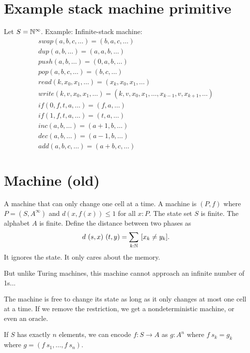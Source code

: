\section{Example stack machine primitive}

Let \(S = \mathbb{N}^\infty\).
Example:
Infinite-stack machine:
\begin{align*}
    swap(a,b,c,\ldots) = (b,a,c,\ldots)
    \\
    dup(a,b,\ldots) = (a,a,b,\ldots)
    \\
    push(a,b,\ldots) = (0,a,b,\ldots)
    \\
    pop(a,b,c,\ldots) = (b,c,\ldots)
    \\
    read(k,x_0,x_1,\ldots) = (x_k,x_0,x_1,\ldots)
    \\
    write(k,v,x_0,x_1,\ldots) = (k,v,x_0,x_1,\ldots,x_{k-1},v,x_{k+1},\ldots)
    \\
    if(0,f,t,a,\ldots) = (f,a,\ldots)
    \\
    if(1,f,t,a,\ldots) = (t,a,\ldots)
    \\
    inc(a,b,\ldots) = (a+1,b,\ldots)
    \\
    dec(a,b,\ldots) = (a-1,b,\ldots)
    \\
    add(a,b,c,\ldots) = (a+b,c,\ldots)
\end{align*}

\section{Machine (old)}

A machine that can only change one cell at a time.
A machine is
\((P, f)\)
where \(P = (S,A^\infty)\)
and
\(d(x,f(x)) \le 1\)
for all \(x : P\).
The state set \(S\) is finite.
The alphabet \(A\) is finite.
Define the distance between two phases as
\begin{align}
    d~(s,x)~(t,y) = \sum_{k : \mathbb{N}} ~ [x_k \neq y_k].
\end{align}
It ignores the state.
It only cares about the memory.

But unlike Turing machines, this machine cannot approach an infinite number of 1s...

The machine is free to change its state as long as it only changes at most one cell at a time.
If we remove the restriction, we get a nondeterministic machine,
or even an oracle.

If \(S\) has exactly \(n\) elements,
we can encode \(f : S \to A\) as \(g : A^n\)
where \(f~s_k = g_k\) where \(g = (f~s_1, \ldots, f~s_n)\).

